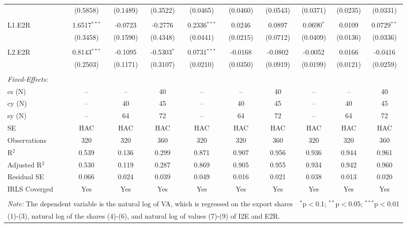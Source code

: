 \documentclass[a4paper]{article}
\begin{document}
\begin{table}[!t]
{\begin{tabular}[t]{lccccccccc}
  & (0.5858) & (0.1489) & (0.3522) & (0.0465) & (0.0460) & (0.0543) & (0.0371) & (0.0235) & (0.0331) \\ 
  & & & & & & & & & \\ 
 L1.E2R & 1.6517$^{***}$ & -0.0723 & -0.2776 & 0.2336$^{***}$ & 0.0246 & 0.0897 & 0.0690$^{*}$ & 0.0109 & 0.0729$^{**}$ \\ 
  & (0.3458) & (0.1590) & (0.4348) & (0.0441) & (0.0215) & (0.0712) & (0.0409) & (0.0136) & (0.0336) \\ 
  & & & & & & & & & \\ 
 L2.E2R & 0.8143$^{***}$ & -0.1095 & -0.5303$^{*}$ & 0.0731$^{***}$ & -0.0168 & -0.0802 & -0.0052 & 0.0166 & -0.0416 \\ 
  & (0.2503) & (0.1171) & (0.3107) & (0.0210) & (0.0350) & (0.0919) & (0.0199) & (0.0121) & (0.0259) \\ 
  & & & & & & & & & \\ 
\midrule \emph{Fixed-Effects:} &   &   &   &   &   &  \\
cs (N) & -- & -- & 40 & -- & -- & 40 & -- & -- & 40\\
cy (N) & -- & 40 & 45 & -- & 40 & 45 & -- & 40 & 45\\
sy (N) & -- & 64 & 72 & -- & 64 & 72 & -- & 64 & 72\\
\midrule
SE & HAC & HAC & HAC &HAC &HAC &HAC &HAC &HAC &HAC \\
Observations & 320 & 320 & 360 & 320 & 320 & 360 & 320 & 320 & 360 \\ 
R$^{2}$ & 0.539 & 0.136 & 0.299 & 0.871 & 0.907 & 0.956 & 0.936 & 0.944 & 0.961 \\ 
Adjusted R$^{2}$ & 0.530 & 0.119 & 0.287 & 0.869 & 0.905 & 0.955 & 0.934 & 0.942 & 0.960 \\ 
Residual SE & 0.066 & 0.024 & 0.039 & 0.049 & 0.016 & 0.021 & 0.038 & 0.013 & 0.020 \\ 
IRLS Coverged & Yes & Yes & Yes & Yes & Yes & Yes & Yes & Yes & Yes \\ \bottomrule \\[-1em]
\multicolumn{7}{l}{\small \textit{Note:} The dependent variable is the natural log of VA, which is regressed on the  export shares}   & \multicolumn{3}{r}{$^{*}$p$<$0.1; $^{**}$p$<$0.05; $^{***}$p$<$0.01} \\ [-0.2em]
\multicolumn{10}{l}{\small \quad \quad \quad (1)-(3), natural log of the shares (4)-(6), and natural log of values (7)-(9) of I2E and E2R.} \\
\end{tabular} 
}
\end{table} 
\FloatBarrier
\end{document}

